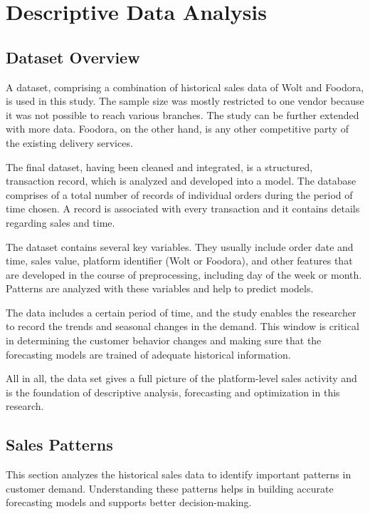 \section{Descriptive Data Analysis}

\subsection{Dataset Overview}

A dataset, comprising a combination of historical sales data of Wolt and Foodora, is used in this study. The sample size was mostly restricted to one vendor because it was not possible to reach various branches. The study can be further extended with more data. Foodora, on the other hand, is any other competitive party of the existing delivery services.

The final dataset, having been cleaned and integrated, is a structured, transaction record, which is analyzed and developed into a model. The database comprises of a total number of records of individual orders during the period of time chosen. A record is associated with every transaction and it contains details regarding sales and time.

The dataset contains several key variables. They usually include order date and time, sales value, platform identifier (Wolt or Foodora), and other features that are developed in the course of preprocessing, including day of the week or month. Patterns are analyzed with these variables and help to predict models.

The data includes a certain period of time, and the study enables the researcher to record the trends and seasonal changes in the demand. This window is critical in determining the customer behavior changes and making sure that the forecasting models are trained of adequate historical information. 

All in all, the data set gives a full picture of the platform-level sales activity and is the foundation of descriptive analysis, forecasting and optimization in this research.


\subsection{Sales Patterns}

This section analyzes the historical sales data to identify important patterns in customer demand. Understanding these patterns helps in building accurate forecasting models and supports better decision-making.

